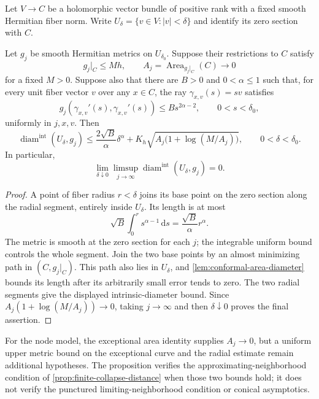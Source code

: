Let $V\to C$ be a holomorphic vector bundle of positive rank with a fixed smooth Hermitian fiber norm. Write $U_\delta=\{v\in V:|v|<\delta\}$ and identify its zero section with $C$.

\begin{proposition}\label{prop:radial-tube-diameter}
Let $g_j$ be smooth Hermitian metrics on $U_{\delta_0}$. Suppose their restrictions to $C$ satisfy
\[
 g_j|_C\leq M h,\qquad
 A_j=\operatorname{Area}_{g_j|_C}(C)\longrightarrow0
\]
for a fixed $M>0$. Suppose also that there are $B>0$ and $0<\alpha\leq1$ such that, for every unit fiber vector $v$ over any $x\in C$, the ray $\gamma_{x,v}(s)=sv$ satisfies
\[
 g_j(\gamma_{x,v}'(s),\gamma_{x,v}'(s))
       \leq B s^{2\alpha-2},
       \qquad 0<s<\delta_0,
\]
uniformly in $j,x,v$. Then
\[
 \operatorname{diam}^{\mathrm{int}}(U_\delta,g_j)
 \leq\frac{2\sqrt B}{\alpha}\delta^\alpha
       +K_h\sqrt{A_j\bigl(1+\log(M/A_j)\bigr)},
       \qquad 0<\delta<\delta_0.
\]
In particular,
\[
 \lim_{\delta\downarrow0}\limsup_{j\to\infty}
       \operatorname{diam}^{\mathrm{int}}(U_\delta,g_j)=0.
\]
\end{proposition}
\begin{proof}
A point of fiber radius $r<\delta$ joins its base point on the zero section along the radial segment, entirely inside $U_\delta$. Its length is at most
\[
 \sqrt B\int_0^r s^{\alpha-1}\,\mathrm{d}s
       =\frac{\sqrt B}{\alpha}r^\alpha.
\]
The metric is smooth at the zero section for each $j$; the integrable uniform bound controls the whole segment. Join the two base points by an almost minimizing path in $(C,g_j|_C)$. This path also lies in $U_\delta$, and \cref{lem:conformal-area-diameter} bounds its length after its arbitrarily small error tends to zero. The two radial segments give the displayed intrinsic-diameter bound. Since $A_j(1+\log(M/A_j))\to0$, taking $j\to\infty$ and then $\delta\downarrow0$ proves the final assertion.
\end{proof}

For the node model, the exceptional area identity supplies $A_j\to0$, but a uniform upper metric bound on the exceptional curve and the radial estimate remain additional hypotheses. The proposition verifies the approximating-neighborhood condition of \cref{prop:finite-collapse-distance} when those two bounds hold; it does not verify the punctured limiting-neighborhood condition or conical asymptotics.
